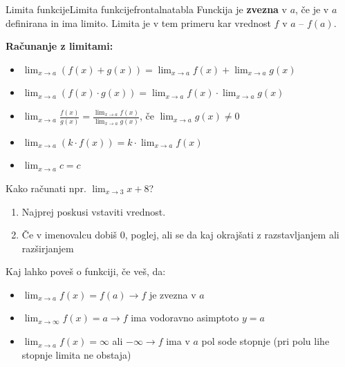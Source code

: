 \begin{priprava}{}{}{Limita funkcije}{Limita funkcije}{frontalna}{tabla}
Funckija je \textbf{zvezna} v $ a $, če je v $ a $ definirana in ima limito. Limita je v tem primeru kar vrednost $ f $ v $ a $ -- $ f(a) $. 

\newpage

\textbf{Računanje z limitami:} 
\begin{itemize}
    \item $ \lim_{x \to a} (f(x) + g(x)) = \lim_{x \to a} f(x) + \lim_{x \to a} g(x) $
    \item $ \lim_{x \to a} (f(x) \cdot g(x)) = \lim_{x \to a} f(x) \cdot \lim_{x \to a} g(x) $
    \item $ \lim_{x \to a} \frac{f(x)}{g(x)} = \frac{\lim_{x \to a} f(x)}{\lim_{x \to a} g(x)} $, če $ \lim_{x \to a} g(x) \neq 0 $
    \item $ \lim_{x \to a} (k \cdot f(x)) =  k \cdot \lim_{x \to a} f(x) $
    \item $ \lim_{x \to a} c = c $
\end{itemize}

Kako računati npr. $ \lim_{x \to 3} x + 8 $?
\begin{enumerate}
    \item Najprej poskusi vstaviti vrednost.
    \item Če v imenovalcu dobiš 0, poglej, ali se da kaj okrajšati z razstavljanjem ali razširjanjem
\end{enumerate}


Kaj lahko poveš o funkciji, če veš, da: 
\begin{itemize}
    \item $ \lim_{x \to a} f(x) = f(a) \to f $ je zvezna v $ a $
    \item $ \lim_{x \to \infty} f(x) = a \to f $ ima vodoravno asimptoto $ y = a $ 
    \item $ \lim_{x \to a} f(x) = \infty $ ali $ - \infty \rightarrow f $ ima v $ a $ pol sode stopnje (pri polu lihe stopnje limita ne obstaja)
\end{itemize}
    

\end{priprava}
